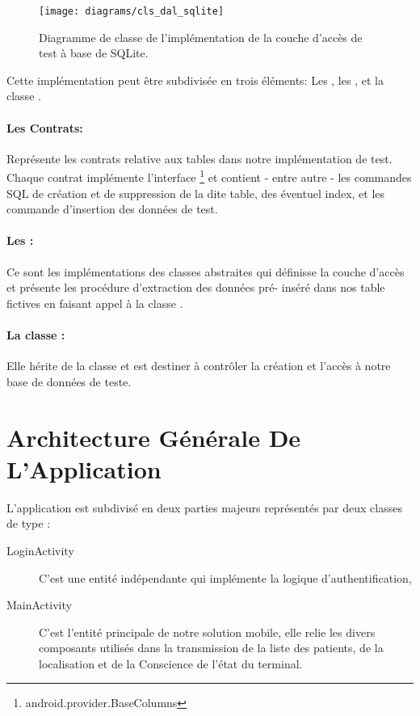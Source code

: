 \begin{figure}
\center
\texttt{[image: diagrams/cls\_dal\_sqlite]}
\caption{Diagramme de classe de l'implémentation de la couche d'accès de test à base de SQLite.}
\label{fig:dal_sqlite}
\end{figure}

Cette implémentation peut être subdivisée en trois éléments: Les , les , et la classe .

\paragraph{Les Contrats:}

Représente les contrats relative aux tables dans notre implémentation de
test. Chaque contrat implémente l'interface
\footnote{android.provider.BaseColumns} et contient - entre autre - les
commandes SQL de création et de suppression de la dite table, des
éventuel index, et les commande d'insertion des données de test.

\paragraph{Les :} 

Ce sont les implémentations des classes abstraites qui définisse la
couche d’accès et présente les procédure d'extraction des données pré-
inséré dans nos table fictives en faisant appel à la classe
 .

\paragraph[La classe \dev{DBSetup}:]{La classe :} 

Elle hérite de la classe  et est destiner à
contrôler la création et l’accès à notre base de données de teste.



\section{Architecture Générale De L'Application}

L'application est subdivisé en deux parties majeurs représentés par deux classes de type  :

\begin{description}

\item [LoginActivity] C'est une entité indépendante qui implémente la logique d'authentification, 

\item [MainActivity] C'est l'entité principale de notre solution mobile, elle relie les divers composants utilisés dans la transmission de la liste des patients, de la localisation et de la Conscience de l'état du terminal.

\end{description}


